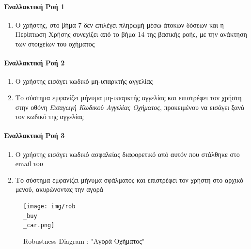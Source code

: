 \documentclass{../ol-softwaremanual}
\begin{document}
	\paragraph{Εναλλακτική Ροή 1}
	\begin{enumerate}
		\item Ο χρήστης, στο βήμα 7 δεν επιλέγει πληρωμή μέσω άτοκων δόσεων και η Περίπτωση Χρήσης συνεχίζει από το βήμα 14 της βασικής ροής, με την ανάκτηση των στοιχείων του οχήματος
	\end{enumerate}

	\paragraph{Εναλλακτική Ροή 2}
	\begin{enumerate}
		\item Ο χρήστης εισάγει κωδικό μη-υπαρκτής αγγελίας
		\item Το σύστημα εμφανίζει μήνυμα μη-υπαρκτής αγγελίας και επιστρέφει τον χρήστη στην οθόνη \textit{Εισαγωγή Κωδικού Αγγελίας Οχήματος}, προκειμένου να εισάγει ξανά τον κωδικό της αγγελίας 
	\end{enumerate}

	\paragraph{Εναλλακτική Ροή 3}
	\begin{enumerate}
		\item Ο χρήστης εισάγει κωδικό ασφαλείας διαφορετικό από αυτόν που στάλθηκε στο \en email \gr του
		\item Το σύστημα εμφανίζει μήνυμα σφάλματος και επιστρέφει τον χρήστη στο αρχικό μενού, ακυρώνοντας την αγορά
	\end{enumerate}

	\newpage	
	
	\begin{figure}[htbp!]
		\texttt{[image: img/rob\\\_buy\\\_car.png]}
		\caption{\en Robustness Diagram : "\gr Αγορά Οχήματος\en"\gr\protect\footnotemark[4]}
	\end{figure}

\end{document}
